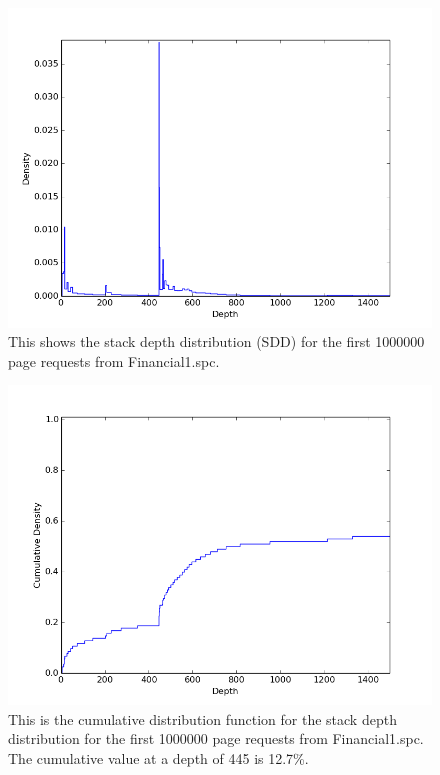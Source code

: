   \begin{figure}
  \centering
  \includegraphics[width=6in]{../media/sdd_financial1_0-1000000.png}
  \caption[SDD of trace Financial1.spc]{This shows the stack depth distribution
  (SDD) for the first 1000000 page requests from Financial1.spc.}
  \label{fig:sdd_financial1}
  \end{figure}

  \begin{figure}
  \centering
  \includegraphics[width=6in]{../media/sdd_cdf_financial1_0-1000000.png}
  \caption[CDF for the SDD of trace Financial1.spc]{This is the cumulative
  distribution function for the stack depth distribution for the first 1000000
  page requests from Financial1.spc. The cumulative value at a depth of 445 is
  12.7\%.}
  \label{fig:sdd_cdf_financial1}
  \end{figure}

